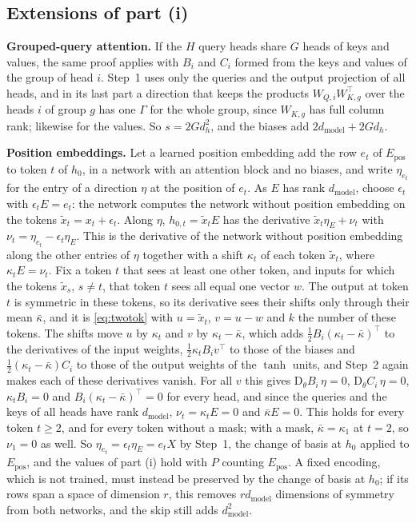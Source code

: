 \documentclass[10pt]{article}
\theoremstyle{definition}
\theoremstyle{remark}
\newcommand{\dm}{d_{\mathrm{model}}}
\newcommand{\Der}{\mathrm{D}}
\newcommand{\para}[1]{\smallskip\noindent\textbf{#1}\hspace{0.5em}}
\begin{document}
\FloatBarrier
\subsection*{Extensions of part (i)}

\para{Grouped-query attention.} If the $H$ query heads share $G$ heads of keys and values, the same proof applies with $B_i$ and $C_i$ formed from the keys and values of the group of head $i$. Step~1 uses only the queries and the output projection of all heads, and in its last part a direction that keeps the products $W_{Q,i}W_{K,g}^\top$ over the heads $i$ of group $g$ has one $\Gamma$ for the whole group, since $W_{K,g}$ has full column rank; likewise for the values. So $s = 2Gd_h^2$, and the biases add $2\dm + 2Gd_h$.

\para{Position embeddings.} Let a learned position embedding add the row $e_t$ of $E_{\mathrm{pos}}$ to token $t$ of $h_0$, in a network with an attention block and no biases, and write $\eta_{e_t}$ for the entry of a direction $\eta$ at the position of $e_t$. As $E$ has rank $\dm$, choose $\epsilon_t$ with $\epsilon_tE = e_t$: the network computes the network without position embedding on the tokens $\tilde x_t = x_t + \epsilon_t$. Along $\eta$, $h_{0,t} = \tilde x_tE$ has the derivative $\tilde x_t\eta_E + \nu_t$ with $\nu_t = \eta_{e_t} - \epsilon_t\eta_E$. This is the derivative of the network without position embedding along the other entries of $\eta$ together with a shift $\kappa_t$ of each token $\tilde x_t$, where $\kappa_tE = \nu_t$. Fix a token $t$ that sees at least one other token, and inputs for which the tokens $\tilde x_s$, $s \neq t$, that token $t$ sees all equal one vector $w$. The output at token $t$ is symmetric in these tokens, so its derivative sees their shifts only through their mean $\bar\kappa$, and it is \cref{eq:twotok} with $u = \tilde x_t$, $v = u - w$ and $k$ the number of these tokens. The shifts move $u$ by $\kappa_t$ and $v$ by $\kappa_t - \bar\kappa$, which adds $\tfrac12B_i(\kappa_t - \bar\kappa)^\top$ to the derivatives of the input weights, $\tfrac12\kappa_tB_iv^\top$ to those of the biases and $\tfrac12(\kappa_t - \bar\kappa)C_i$ to those of the output weights of the $\tanh$ units, and Step~2 again makes each of these derivatives vanish. For all $v$ this gives $\Der_\theta B_i\,\eta = 0$, $\Der_\theta C_i\,\eta = 0$, $\kappa_tB_i = 0$ and $B_i(\kappa_t - \bar\kappa)^\top = 0$ for every head, and since the queries and the keys of all heads have rank $\dm$, $\nu_t = \kappa_tE = 0$ and $\bar\kappa E = 0$. This holds for every token $t \ge 2$, and for every token without a mask; with a mask, $\bar\kappa = \kappa_1$ at $t = 2$, so $\nu_1 = 0$ as well. So $\eta_{e_t} = \epsilon_t\eta_E = e_tX$ by Step~1, the change of basis at $h_0$ applied to $E_{\mathrm{pos}}$, and the values of part (i) hold with $P$ counting $E_{\mathrm{pos}}$. A fixed encoding, which is not trained, must instead be preserved by the change of basis at $h_0$; if its rows span a space of dimension $r$, this removes $r\dm$ dimensions of symmetry from both networks, and the skip still adds $\dm^2$.
\end{document}
